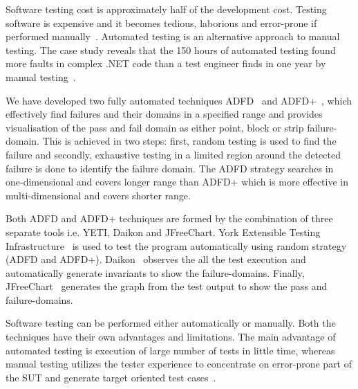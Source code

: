 \documentclass[conference]{IEEEtran}
\begin{document}
Software testing cost is approximately half of the development cost. Testing software is expensive and it becomes tedious, laborious and error-prone if performed manually~\cite{Beizer1990}. Automated testing is an alternative approach to manual testing. The case study reveals that the 150 hours of automated testing found more faults in complex .NET code than a test engineer finds in one year by manual testing~\cite{pacheco2008finding}. 

We have developed two fully automated techniques ADFD~\cite{ahmad2013adfd} and ADFD+~\cite{ahmad2014adfd2}, which effectively find failures and their domains in a specified range and provides visualisation of the pass and fail domain as either point, block or strip failure-domain. This is achieved in two steps: first, random testing is used to find the failure and secondly, exhaustive testing in a limited region around the detected failure is done to identify the failure domain. The ADFD strategy searches in one-dimensional and covers longer range than ADFD+ which is more effective in multi-dimensional and covers shorter range.

Both ADFD and ADFD+ techniques are formed by the combination of three separate tools i.e. YETI, Daikon and JFreeChart. York Extensible Testing Infrastructure~\cite{Oriol2011yeti} is used to test the program automatically using random strategy (ADFD and ADFD+). Daikon~\cite{ernst2007daikon} observes the all the test execution and automatically generate invariants to show the failure-domains. Finally, JFreeChart~\cite{gilbert2008jfreechart} generates the graph from the test output to show the pass and failure-domains. 

Software testing can be performed either automatically or manually. Both the techniques have their own advantages and limitations. The main advantage of automated testing is execution of large number of tests in little time, whereas manual testing utilizes the tester experience to concentrate on error-prone part of the SUT and generate target oriented test cases~\cite{Leitner2007}. 





\end{document}
